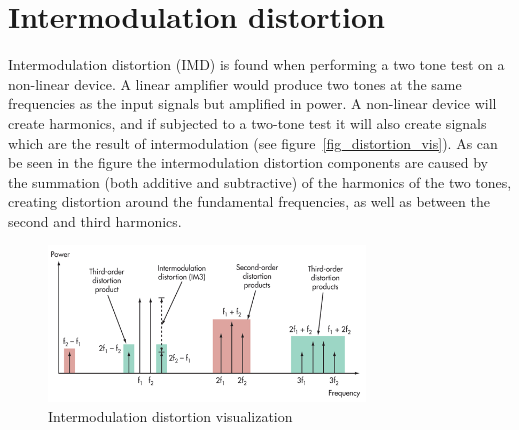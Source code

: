 \section{Intermodulation distortion}
Intermodulation distortion (IMD) is found when performing a two tone test on a non-linear device. A linear amplifier would produce two tones at the same frequencies as the input signals but amplified in power. A non-linear device will create harmonics, and if subjected to a two-tone test it will also create signals which are the result of intermodulation (see figure~\ref{fig_distortion_vis}). As can be seen in the figure the intermodulation distortion components are caused by the summation (both additive and subtractive) of the harmonics of the two tones, creating distortion around the fundamental frequencies, as well as between the second and third harmonics.
\begin{figure}[H]
	  \centering
	  \includegraphics[width=0.75\textwidth]{img/Intermodulation_distortion}
	  \caption{Intermodulation distortion visualization}
	  \label{fig:fig_distortion_vis}
\end{figure}